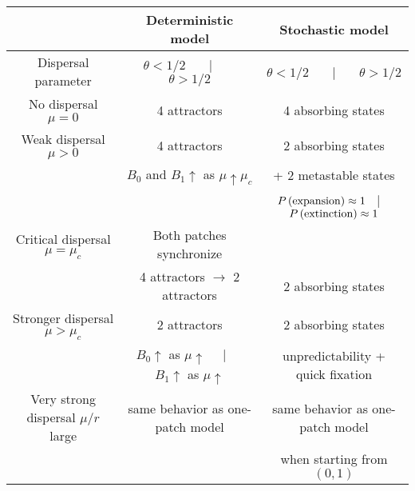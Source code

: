 \begin{table}[h]
\begin{center}
\caption{}
\begin{tabular}{|c|c|c|}
\hline & Deterministic model & Stochastic model \\ \hline
 Dispersal parameter               & $\theta < 1/2$ \ \ \ $|$ \ \ \ $\theta > 1/2$ & $\theta < 1/2$ \ \ \ $|$ \ \ \ $\theta > 1/2$ \\ \hline
 No dispersal $\mu = 0$            & 4 attractors & 4 absorbing states \\ \hline
 Weak dispersal $\mu > 0$          & 4 attractors & 2 absorbing states \\
                                   & $B_0$ and $B_1 \uparrow$ as $\mu \uparrow \mu_c$ & + 2 metastable states \\
                                   & & $P \,(\hbox{expansion}) \approx 1$ \ $|$ \ $P \,(\hbox{extinction}) \approx 1$ \\ \hline
 Critical dispersal $\mu = \mu_c$  & Both patches synchronize & \\
                                   & 4 attractors ${{\rightarrow}}$ 2 attractors & 2 absorbing states \\ \hline
 Stronger dispersal $\mu > \mu_c$  & 2 attractors & 2 absorbing states \\
                                   & $B_0 \uparrow$ as $\mu \uparrow$ \ \ $|$ \ \ $B_1 \uparrow$ as $\mu \uparrow$ & unpredictability + quick fixation \\ \hline
 Very strong dispersal $\mu/r$ large  & same behavior as one-patch model & same behavior as one-patch model \\
                                   &  & when starting from $(0, 1)$ \\ \hline
\end{tabular}
\end{center}
\label{tab:comparison}
\end{table}

